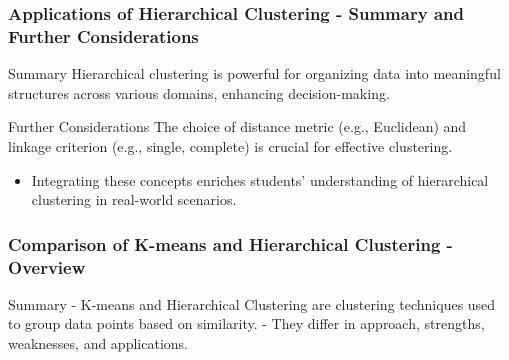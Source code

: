 \documentclass[aspectratio=169]{beamer}
\begin{document}
\begin{frame}[fragile]
    \frametitle{Applications of Hierarchical Clustering - Summary and Further Considerations}
    \begin{block}{Summary}
        Hierarchical clustering is powerful for organizing data into meaningful structures across various domains, enhancing decision-making.
    \end{block}
    
    \begin{block}{Further Considerations}
        The choice of distance metric (e.g., Euclidean) and linkage criterion (e.g., single, complete) is crucial for effective clustering.
    \end{block}
    
    \begin{itemize}
        \item Integrating these concepts enriches students' understanding of hierarchical clustering in real-world scenarios.
    \end{itemize}
\end{frame}

\begin{frame}[fragile]
    \frametitle{Comparison of K-means and Hierarchical Clustering - Overview}
    \begin{block}{Summary}
        - K-means and Hierarchical Clustering are clustering techniques used to group data points based on similarity. 
        - They differ in approach, strengths, weaknesses, and applications. 
    \end{block}
\end{frame}
\end{document}
